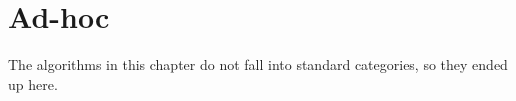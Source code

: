 \chapter{Ad-hoc}
The algorithms in this chapter do not fall into 
standard categories, so they ended up here. 

